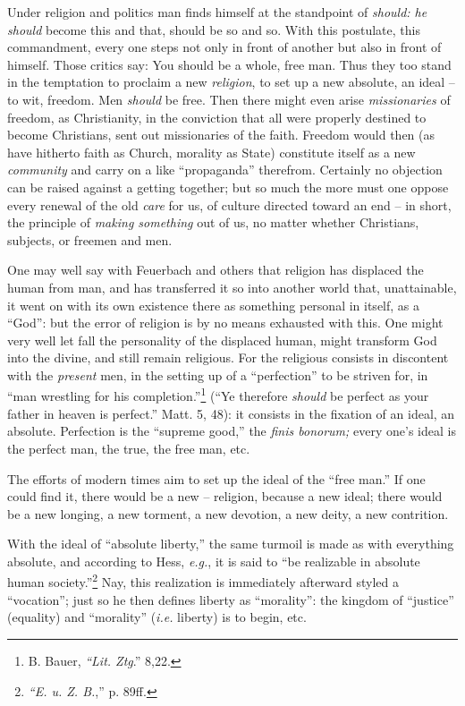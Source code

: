 Under religion and politics man finds himself at the standpoint of 
\textit{should: he should} become this and that, should be so and so. With 
this postulate, this commandment, every one steps not only in front of another 
but also in front of himself. Those critics say: You should be a whole, free 
man. Thus they too stand in the temptation to proclaim a new 
\textit{religion}, to set up a new absolute, an ideal -- to wit, freedom. Men 
\textit{should} be free. Then there might even arise \textit{missionaries} of 
freedom, as Christianity, in the conviction that all were properly destined to 
become Christians, sent out missionaries of the faith. Freedom would then (as 
have hitherto faith as Church, morality as State) constitute itself as a new 
\textit{community} and carry on a like ``propaganda'' therefrom. Certainly 
no objection can be raised against a getting together; but so much the more 
must one oppose every renewal of the old \textit{care} for us, of culture 
directed toward an end -- in short, the principle of \textit{making something} 
out of us, no matter whether Christians, subjects, or freemen and men.

One may well say with Feuerbach and others that religion has displaced the 
human from man, and has transferred it so into another world that, 
unattainable, it went on with its own existence there as something personal in 
itself, as a ``God'': but the error of religion is by no means exhausted 
with this. One might very well let fall the personality of the displaced 
human, might transform God into the divine, and still remain religious. For 
the religious consists in discontent with the \textit{present} men, in the 
setting up of a ``perfection'' to be striven for, in ``man wrestling for 
his completion.''\footnote{B. Bauer, \textit{``Lit. Ztg}.'' 8,22.} (``Ye 
therefore \textit{should} be perfect as your father in heaven is perfect.'' 
Matt. 5, 48): it consists in the fixation of an ideal, an absolute. Perfection 
is the ``supreme good,'' the \textit{finis bonorum;} every one's ideal is 
the perfect man, the true, the free man, etc.

The efforts of modern times aim to set up the ideal of the ``free man.'' If 
one could find it, there would be a new -- religion, because a new ideal; 
there would be a new longing, a new torment, a new devotion, a new deity, a 
new contrition.

With the ideal of ``absolute liberty,'' the same turmoil is made as with 
everything absolute, and according to Hess, \textit{e.g.}, it is said to 
``be realizable in absolute human society.''\footnote{\textit{``E. u. Z. 
B.},'' p. 89ff.} Nay, this realization is immediately afterward styled a 
``vocation''; just so he then defines liberty as ``morality'': the kingdom 
of ``justice'' (equality) and ``morality'' (\textit{i.e.} liberty) is to 
begin, etc.

